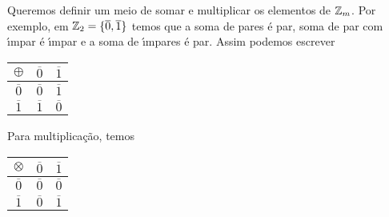 \documentclass{beamer}
\begin{document}
    \begin{frame}
        Queremos definir um meio de somar e multiplicar os elementos de $\mathbb{Z}_m$. Por exemplo, em $\mathbb{Z}_2 = \{\overline{0},\overline{1}\}$ temos que a soma de pares {\'e} par, soma de par com {\'\i}mpar {\'e} {\'\i}mpar e a soma de {\'\i}mpares {\'e} par. Assim podemos escrever

        \begin{table}[h]
           \centering 
           \setlength{\arrayrulewidth}{0,5\arrayrulewidth}
           \begin{tabular}{|c|c|c|} 
              \hline
              $\oplus$ & $\overline{0}$ & $\overline{1}$ \T\\
              \hline
              $\overline{0}$ & $\overline{0}$ & $\overline{1}$\T\\
              \hline
              $\overline{1}$ & $\overline{1}$ & $\overline{0}$\T\\
              \hline
           \end{tabular}
        \end{table}

        Para multiplica{\c c}{\~a}o, temos

        \begin{table}[h]
           \centering 
           \setlength{\arrayrulewidth}{0,5\arrayrulewidth}
           \begin{tabular}{|c|c|c|} 
              \hline
              $\otimes$ & $\overline{0}$ & $\overline{1}$\T\\
              \hline
              $\overline{0}$ & $\overline{0}$ & $\overline{0}$\T\\
              \hline
              $\overline{1}$ & $\overline{0}$ & $\overline{1}$\T\\
              \hline
           \end{tabular}
        \end{table}
    \end{frame}
\end{document}
